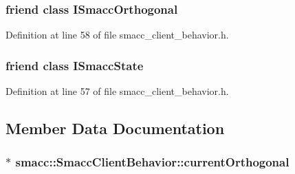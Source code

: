 \subsubsection[{\texorpdfstring{I\+Smacc\+Orthogonal}{ISmaccOrthogonal}}]{\setlength{\rightskip}{0pt plus 5cm}friend class {\bf I\+Smacc\+Orthogonal}\hspace{0.3cm}{\ttfamily [friend]}}\hypertarget{classsmacc_1_1SmaccClientBehavior_a7205cc84a71fea903124d54d01e99a68}{}\label{classsmacc_1_1SmaccClientBehavior_a7205cc84a71fea903124d54d01e99a68}


Definition at line 58 of file smacc\+\_\+client\+\_\+behavior.\+h.

\subsubsection[{\texorpdfstring{I\+Smacc\+State}{ISmaccState}}]{\setlength{\rightskip}{0pt plus 5cm}friend class {\bf I\+Smacc\+State}\hspace{0.3cm}{\ttfamily [friend]}}\hypertarget{classsmacc_1_1SmaccClientBehavior_ab907e4cdbf326246355f56640780162e}{}\label{classsmacc_1_1SmaccClientBehavior_ab907e4cdbf326246355f56640780162e}


Definition at line 57 of file smacc\+\_\+client\+\_\+behavior.\+h.



\subsection{Member Data Documentation}
\subsubsection[{\texorpdfstring{current\+Orthogonal}{currentOrthogonal}}]{$\ast$ smacc\+::\+Smacc\+Client\+Behavior\+::current\+Orthogonal\hspace{0.3cm}{\ttfamily [private]}}\hypertarget{classsmacc_1_1SmaccClientBehavior_a37e6a2fe61c3a72ed2f3e4180f552089}{}\label{classsmacc_1_1SmaccClientBehavior_a37e6a2fe61c3a72ed2f3e4180f552089}



